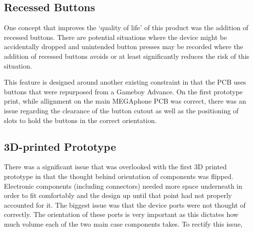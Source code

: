 \subsection{Recessed Buttons}


One concept that improves the ‘quality of life’ of this product was the addition of recessed buttons.
There are potential situations where the device might be accidentally dropped and unintended button presses may be recorded where the addition of recessed buttons avoids or at least significantly reduces the risk of this situation.

This feature is designed around another existing constraint in that the PCB uses buttons that were repurposed from a Gameboy Advance. %
On the first prototype print, while allignment on the main MEGAphone PCB was correct, there was an issue regarding the clearance of the button cutout as well as the positioning of slots to hold the buttons in the correct orientation.


\subsection{3D-printed Prototype}

There was a significant issue that was overlooked with the first 3D printed prototype in that the thought behind orientation of components was flipped.
Electronic components (including connectors) needed more space underneath in order to fit comfortably and the design up until that point had not properly accounted for it.
The biggest issue was that the device ports were not thought of correctly.
The orientation of these ports is very important as this dictates how much volume each of the two main case components takes.
To rectify this issue, 



